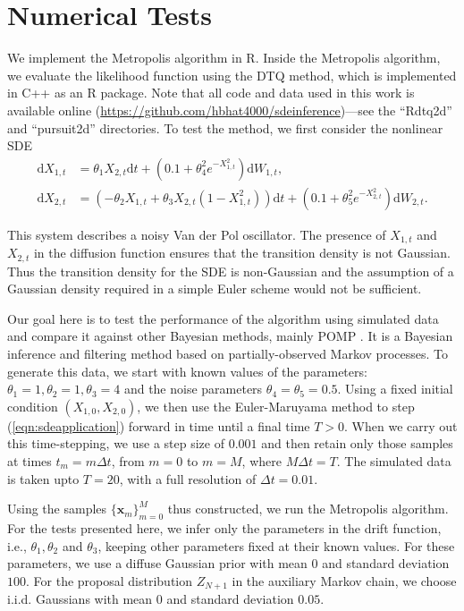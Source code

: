 \documentclass[graybox]{svmult}
\begin{document}
\section{Numerical Tests}
\label{sec:3}
We implement the Metropolis algorithm in R. Inside the Metropolis algorithm, we evaluate the likelihood function using the DTQ method, which is implemented in C++ as an R package. Note that all code and data used in this work is available online (\url{https://github.com/hbhat4000/sdeinference})---see the ``Rdtq2d'' and ``pursuit2d'' directories.
To test the method, we first consider the nonlinear SDE
\begin{subequations}
\label{eqn:sdeapplication}
\begin{align}
\mathrm{d}X_{1,t} & =  \theta_1 X_{2,t} \mathrm{d}t + (0.1 + \theta_4^2 e^{-X_{1,t}^2}) \mathrm{d}W_{1,t}, \\
\mathrm{d}X_{2,t} & = (-\theta_2 X_{1,t} + \theta_3 X_{2,t} (1 - X_{1,t}^2)) \mathrm{d}t + (0.1 + \theta_5^2 e^{-X_{2,t}^2}) \mathrm{d}W_{2,t}.
\end{align}
\end{subequations}

This system describes a noisy Van der Pol oscillator. The presence of $X_{1,t}$ and $X_{2,t}$ in the diffusion function ensures that the transition density is not Gaussian. Thus the transition density for the SDE is non-Gaussian and the assumption of a Gaussian density required in a simple Euler scheme would not be sufficient.

Our goal here is to test the performance of the algorithm using simulated data and compare it against other Bayesian methods, mainly POMP \cite{king2016statistical}. It is a Bayesian inference and filtering method based on partially-observed Markov processes. To generate this data, we start with known values of the parameters: $\theta_1 = 1, \theta_2 = 1, \theta_3 = 4$ and the noise parameters $\theta_4 =  \theta_5 = 0.5$. Using a fixed initial condition $(X_{1,0},X_{2,0})$, we then use the Euler-Maruyama method to step (\ref{eqn:sdeapplication}) forward in time until a final time $T > 0$. When we carry out this time-stepping, we use a step size of $0.001$ and then retain only those samples at times $t_m = m \Delta t$, from $m = 0$ to $m = M$, where $M \Delta t = T$. The simulated data is taken upto $T = 20$, with a full resolution of $\Delta t = 0.01$.

Using the samples $\{ \mathbf{x}_m \}_{m=0}^M$ thus constructed, we run the Metropolis algorithm. For the tests presented here, we infer only the parameters in the drift function, i.e., $\theta_1, \theta_2$ and $\theta_3$, keeping other parameters fixed at their known values. For these parameters, we use a diffuse Gaussian prior with mean $0$ and standard deviation $100$. For the proposal distribution $Z_{N+1}$ in the auxiliary Markov chain, we choose i.i.d. Gaussians with mean $0$ and standard deviation $0.05$.
\end{document}
